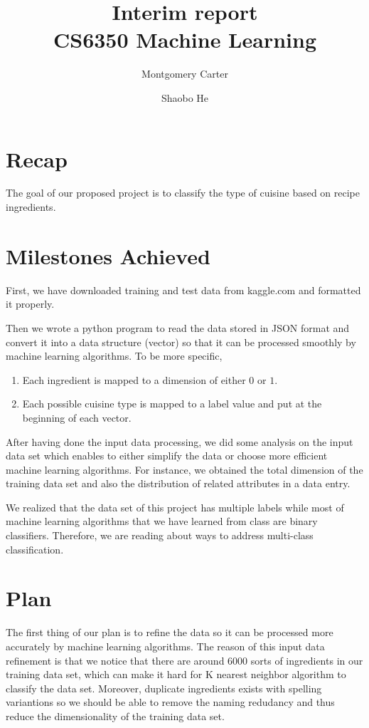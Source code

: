 \documentclass[11pt]{article}
\title{Interim report\\CS6350 Machine Learning}
\author{Montgomery Carter \and Shaobo He}
\begin{document}
\maketitle

\section{Recap}
The goal of our proposed project is to classify the type of cuisine based on recipe ingredients.
\section{Milestones Achieved}
\label{sec:background}
First, we have downloaded training and test data from kaggle.com and formatted it properly.

Then we wrote a python program to read the data stored in JSON format and convert it into a data structure (vector)
so that it can be processed smoothly by machine learning algorithms. To be more specific,
	\begin{enumerate}
		\item Each ingredient is mapped to a dimension of either $0$ or $1$.
		\item Each possible cuisine type is mapped to a label value and put at the beginning of each vector.
	\end{enumerate}

After having done the input data processing, we did some analysis on the input data set which enables to either simplify the data or choose more efficient machine learning algorithms. For instance, we obtained the total dimension of the training data set and also the distribution of related attributes in a data entry. 

We realized that the data set of this project has multiple labels while most of machine learning algorithms that we have learned from class are binary classifiers. Therefore, we are reading about ways to address multi-class classification.\cite{wiki}


\section{Plan}
\label{sec:plan}

The first thing of our plan is to refine the data so it can be processed more accurately by machine learning algorithms. The reason of this input data refinement is that
we notice that there are around $6000$ sorts of ingredients in our training data set, which can make it hard for K nearest neighbor algorithm to classify the data set.
Moreover, duplicate ingredients exists with spelling variantions so we should be able to remove the naming redudancy and thus reduce the dimensionality of the training data set.
\end{document}
